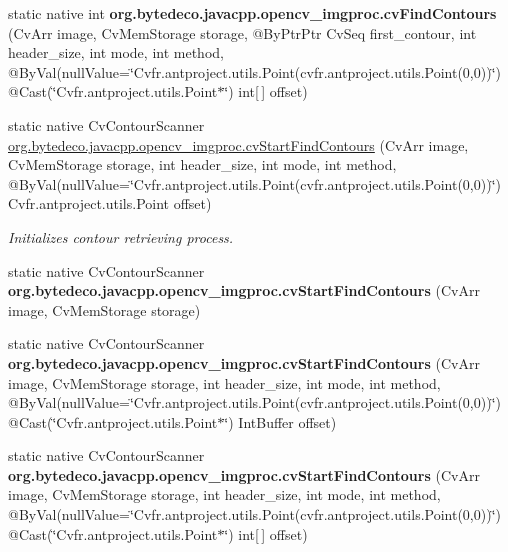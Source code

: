 \begin{DoxyCompactItemize}
\item 
\mbox{\label{group__imgproc__c_gafffa97bdbc94b4d59293006d3792bcf3}} 
static native int {\bfseries org.\+bytedeco.\+javacpp.\+opencv\+\_\+imgproc.\+cv\+Find\+Contours} (Cv\+Arr image, Cv\+Mem\+Storage storage, @By\+Ptr\+Ptr Cv\+Seq first\+\_\+contour, int header\+\_\+size, int mode, int method, @By\+Val(null\+Value=\char`\"{}Cv\+fr.antproject.utils.Point(cv\+fr.antproject.utils.Point(0,0))\char`\"{}) @Cast(\char`\"{}Cv\+fr.antproject.utils.Point$\ast$\char`\"{}) int\mbox{[}$\,$\mbox{]} offset)
\item 
static native Cv\+Contour\+Scanner \hyperlink{group__imgproc__c_ga17ceae2468b1b23ece917fb982a377ff}{org.\+bytedeco.\+javacpp.\+opencv\+\_\+imgproc.\+cv\+Start\+Find\+Contours} (Cv\+Arr image, Cv\+Mem\+Storage storage, int header\+\_\+size, int mode, int method, @By\+Val(null\+Value=\char`\"{}Cv\+fr.antproject.utils.Point(cv\+fr.antproject.utils.Point(0,0))\char`\"{}) Cv\+fr.antproject.utils.Point offset)
\begin{DoxyCompactList}\small\item\em Initializes contour retrieving process. \end{DoxyCompactList}\item 
\mbox{\label{group__imgproc__c_gafccb8516a9f16f254c892baa973a70d5}} 
static native Cv\+Contour\+Scanner {\bfseries org.\+bytedeco.\+javacpp.\+opencv\+\_\+imgproc.\+cv\+Start\+Find\+Contours} (Cv\+Arr image, Cv\+Mem\+Storage storage)
\item 
\mbox{\label{group__imgproc__c_gab16f82b52d562c5b2833e8f391c8435f}} 
static native Cv\+Contour\+Scanner {\bfseries org.\+bytedeco.\+javacpp.\+opencv\+\_\+imgproc.\+cv\+Start\+Find\+Contours} (Cv\+Arr image, Cv\+Mem\+Storage storage, int header\+\_\+size, int mode, int method, @By\+Val(null\+Value=\char`\"{}Cv\+fr.antproject.utils.Point(cv\+fr.antproject.utils.Point(0,0))\char`\"{}) @Cast(\char`\"{}Cv\+fr.antproject.utils.Point$\ast$\char`\"{}) Int\+Buffer offset)
\item 
\mbox{\label{group__imgproc__c_ga5b6eb27065036cc42c2cbececd69b3d3}} 
static native Cv\+Contour\+Scanner {\bfseries org.\+bytedeco.\+javacpp.\+opencv\+\_\+imgproc.\+cv\+Start\+Find\+Contours} (Cv\+Arr image, Cv\+Mem\+Storage storage, int header\+\_\+size, int mode, int method, @By\+Val(null\+Value=\char`\"{}Cv\+fr.antproject.utils.Point(cv\+fr.antproject.utils.Point(0,0))\char`\"{}) @Cast(\char`\"{}Cv\+fr.antproject.utils.Point$\ast$\char`\"{}) int\mbox{[}$\,$\mbox{]} offset)

\end{DoxyCompactItemize}
